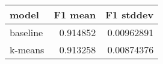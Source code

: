 \begin{tabular}{lrr}
\toprule
 model    &   F1 mean &   F1 stddev \\
\midrule
 baseline &  0.914852 &  0.00962891 \\
 k-means  &  0.913258 &  0.00874376 \\
\bottomrule
\end{tabular}